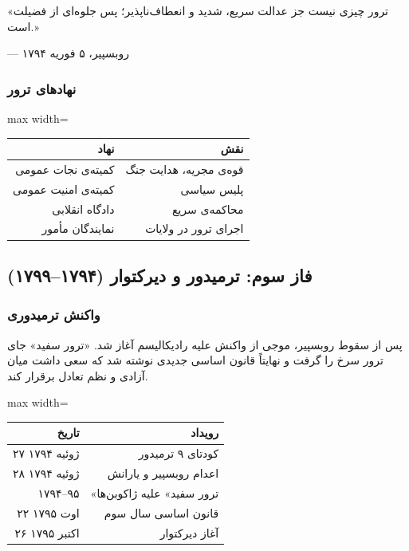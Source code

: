 \begin{tcolorbox}[quotebox]
«ترور چیزی نیست جز عدالت سریع، شدید و انعطاف‌ناپذیر؛
پس جلوه‌ای از فضیلت است.»

\hfill — روبسپیر، ۵ فوریه ۱۷۹۴
\end{tcolorbox}

\subsubsection{نهادهای ترور}

\begin{center}
\begin{adjustbox}{max width=\linewidth}%
\begin{tabular}{rr}
\toprule
\rowcolor{AccentRed!15}
\bfseries نهاد & \bfseries نقش \\
\midrule
\rowcolor{BgWarm} کمیته‌ی نجات عمومی & قوه‌ی مجریه، هدایت جنگ \\
\rowcolor{BgCool} کمیته‌ی امنیت عمومی & پلیس سیاسی \\
\rowcolor{BgWarm} دادگاه انقلابی & محاکمه‌ی سریع \\
\rowcolor{BgCool} نمایندگان مأمور & اجرای ترور در ولایات \\
\bottomrule
\end{tabular}
\end{adjustbox}
\end{center}

\newpage
{}%
\subsection{فاز سوم: ترمیدور و دیرکتوار (۱۷۹۴–۱۷۹۹)}
\label{sec:phase3}

\subsubsection{واکنش ترمیدوری}

پس از سقوط روبسپیر، موجی از واکنش علیه رادیکالیسم آغاز شد.
«ترور سفید» جای ترور سرخ را گرفت و نهایتاً قانون اساسی جدیدی
نوشته شد که سعی داشت میان آزادی و نظم تعادل برقرار کند.

\begin{center}
\begin{adjustbox}{max width=\linewidth}%
\begin{tabular}{rr}
\toprule
\rowcolor{PhaseThermidor}
\color{white}\bfseries تاریخ & \color{white}\bfseries رویداد \\
\midrule
\rowcolor{BgWarm} ۲۷ ژوئیه ۱۷۹۴ & کودتای ۹ ترمیدور \\
\rowcolor{BgCool} ۲۸ ژوئیه ۱۷۹۴ & اعدام روبسپیر و یارانش \\
\rowcolor{BgWarm} ۱۷۹۴–۹۵ & «ترور سفید» علیه ژاکوبن‌ها \\
\rowcolor{BgCool} ۲۲ اوت ۱۷۹۵ & قانون اساسی سال سوم \\
\rowcolor{BgWarm} ۲۶ اکتبر ۱۷۹۵ & آغاز دیرکتوار \\
\bottomrule
\end{tabular}
\end{adjustbox}
\end{center}

